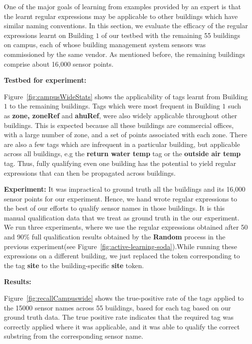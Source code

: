 One of the major goals of learning from examples provided by an expert is that the learnt regular expressions may be applicable to other buildings which have similar naming conventions. In this section, we evaluate the efficacy of the regular expressions learnt on Building $1$ of our testbed with the remaining 55 buildings on campus, each of whose building management system sensors was commissioned by the same vendor. As mentioned before, the remaining buildings comprise about 16,000 sensor points.

{\bf Testbed for experiment:}

Figure~\ref{fig:campusWideStats} shows the applicability of tags learnt from Building $1$ to the remaining buildings. Tags which were most frequent in Building $1$ such as {\bf zone, zoneRef} and {\bf ahuRef}, were also widely applicable throughout other buildings. This is expected because all these buildings are commercial offices, with a large number of zone, and a set of points associated with each zone. There are also a few tags which are infrequent in a particular building, but applicable across all buildings, e.g the {\bf return water temp} tag or the {\bf outside air temp} tag. Thus, fully qualifying even one building has the potential to yield regular expressions that can then be propagated across buildings.

{\bf Experiment:}
It was impractical to ground truth all the buildings and its 16,000 sensor points for our experiment. Hence, we hand wrote regular expressions to the best of our efforts to qualify sensor names in those buildings. It is this manual qualification data that we treat as ground truth in the our experiment. We run three experiments, where we use the regular expressions obtained after 50 and 90\% full qualification results obtained by the {\bf Random} process in the previous experiment(see Figure~\ref{fig:active-learning-soda}).While running these expressions on a different building, we just replaced the token corresponding to the tag {\bf site} to the building-specific {\bf site}  token. 

{\bf Results:}

Figure~\ref{fig:recallCampuswide} shows the true-positive rate of the tags applied to the 15000 sensor names across 55 buildings, based for each tag based on our ground truth data. The true positive rate indicates that the required tag was correctly applied where it was applicable, and it was able to qualify the correct substring from the corresponding sensor name. 

